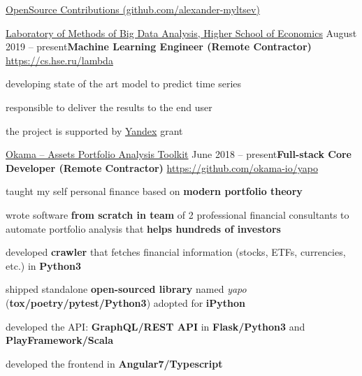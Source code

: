 \documentclass{resume} %
\begin{document}

\begin{rSection}{\href{https://github.com/alexander-myltsev?tab=repositories}{OpenSource
Contributions (github.com/alexander-myltsev)}}

\begin{samepage}
\begin{rSubsection}{\href{https://cs.hse.ru/lambda}
{Laboratory of Methods of Big Data Analysis, Higher School of Economics}}
{August 2019 -- present}{\textbf{Machine Learning Engineer (Remote Contractor)}}
{\href{https://cs.hse.ru/lambda/}{https://cs.hse.ru/lambda}}
\item developing state of the art model to predict time series
\item responsible to deliver the results to the end user
\item the project is supported by \href{http://yandex.ru}{Yandex} grant
\end{rSubsection}
\end{samepage}

\begin{samepage}
\begin{rSubsection}{\href{https://github.com/okama-io/yapo}
{Okama -- Assets Portfolio Analysis Toolkit}}
{June 2018 -- present}{\textbf{Full-stack Core Developer (Remote Contractor)}}
{\href{https://github.com/okama-io/yapo}{https://github.com/okama-io/yapo}}
\item taught my self personal finance based on \textbf{modern portfolio theory} 
\item wrote software \textbf{from scratch in team} of 2 professional financial consultants to automate portfolio analysis that \textbf{helps hundreds of investors}
\item developed \textbf{crawler} that fetches financial information (stocks, ETFs, currencies, etc.) in \textbf{Python3}
\item shipped standalone \textbf{open-sourced library} named \textit{yapo} (\textbf{tox/poetry/pytest/Python3}) adopted
for \textbf{iPython}
\item developed the API: \textbf{GraphQL/REST API} in \textbf{Flask/Python3} and \textbf{PlayFramework/Scala}
\item developed the frontend in \textbf{Angular7/Typescript}
\end{rSubsection}
\end{samepage}


\end{rSection}
\end{document}
